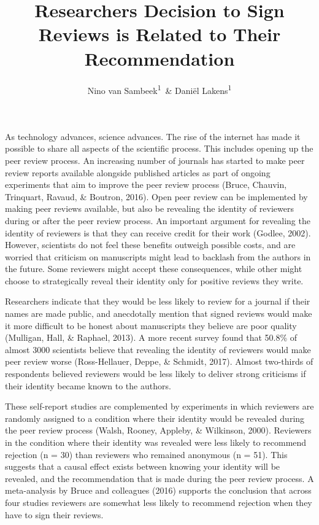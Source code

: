 \documentclass[,jou, a4paper,floatsintext]{apa6}
\title{Researchers Decision to Sign Reviews is Related to Their Recommendation}
\author{Nino van Sambeek\textsuperscript{1}~\& Daniël Lakens\textsuperscript{1}}
\date{}
\affiliation{
\vspace{0.5cm}
\textsuperscript{1} Eindhoven University of Technology, The Netherlands}
\begin{document}
\maketitle

As technology advances, science advances. The rise of the internet has made it possible to share all aspects of the scientific process. This includes opening up the peer review process. An increasing number of journals has started to make peer review reports available alongside published articles as part of ongoing experiments that aim to improve the peer review process (Bruce, Chauvin, Trinquart, Ravaud, \& Boutron, 2016). Open peer review can be implemented by making peer reviews available, but also be revealing the identity of reviewers during or after the peer review process. An important argument for revealing the identity of reviewers is that they can receive credit for their work (Godlee, 2002). However, scientists do not feel these benefits outweigh possible costs, and are worried that criticism on manuscripts might lead to backlash from the authors in the future. Some reviewers might accept these consequences, while other might choose to strategically reveal their identity only for positive reviews they write.

Researchers indicate that they would be less likely to review for a journal if their names are made public, and anecdotally mention that signed reviews would make it more difficult to be honest about manuscripts they believe are poor quality (Mulligan, Hall, \& Raphael, 2013). A more recent survey found that 50.8\% of almost 3000 scientists believe that revealing the identity of reviewers would make peer review worse (Ross-Hellauer, Deppe, \& Schmidt, 2017). Almost two-thirds of respondents believed reviewers would be less likely to deliver strong criticisms if their identity became known to the authors.

These self-report studies are complemented by experiments in which reviewers are randomly assigned to a condition where their identity would be revealed during the peer review process (Walsh, Rooney, Appleby, \& Wilkinson, 2000). Reviewers in the condition where their identity was revealed were less likely to recommend rejection (n = 30) than reviewers who remained anonymous (n = 51). This suggests that a causal effect exists between knowing your identity will be revealed, and the recommendation that is made during the peer review process. A meta-analysis by Bruce and colleagues (2016) supports the conclusion that across four studies reviewers are somewhat less likely to recommend rejection when they have to sign their reviews.
\end{document}
